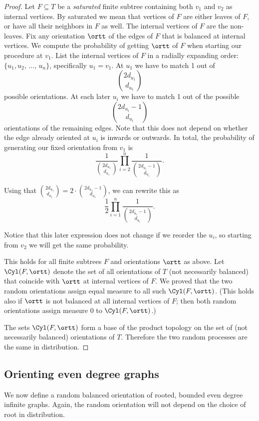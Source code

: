 \begin{proof}
Let $F \subseteq T$ be a \emph{saturated} finite subtree containing both $v_1$ and $v_2$ as internal vertices. By saturated we mean that vertices of $F$ are either leaves of $F$, or have all their neighbors in $F$ as well. The internal vertices of $F$ are the non-leaves. Fix any orientation $\ortt$ of the edges of $F$ that is balanced at internal vertices. We compute the probability of getting $\ortt$ of $F$ when starting our procedure at $v_1$. List the internal vertices of $F$ in a radially expanding order: $\{u_1, u_2,\,\ldots,\,u_n\}$, specifically $u_1 = v_1$. At $u_1$ we have to match 1 out of
\[
\binom{2d_{u_1}}{d_{u_1}}
\]
possible orientations. At each later $u_i$ we have to match 1 out of the possible
\[
\binom{2d_{u_i}-1}{d_{u_i}}
\]
orientations of the remaining edges. Note that this does not depend on whether the edge already oriented at $u_i$ is inwards or outwards. In total, the probability of generating our fixed orientation from $v_1$ is
\[
\frac{1}{\binom{2d_{u_1}}{d_{u_1}}}\prod_{i=2}^{n}\frac{1}{\binom{2d_{u_i}-1}{d_{u_i}}}.
\]

Using that $\binom{2d_{u_1}}{d_{u_1}} = 2 \cdot \binom{2d_{u_1}-1}{d_{u_1}}$, we can rewrite this as
\[
\frac{1}{2}\prod_{i=1}^{n}\frac{1}{\binom{2d_{u_i}-1}{d_{u_i}}}.
\]

Notice that this later expression does not change if we reorder the $u_i$, so starting from $v_2$ we will get the same probability.

This holds for all finite subtrees $F$ and orientations $\ortt$ as above. Let $\Cyl(F,\ortt)$ denote the set of all orientations of $T$ (not necessarily balanced) that coincide with $\ortt$ at internal vertices of $F$. We proved that the two random orientations assign equal measure to all such $\Cyl(F,\ortt)$. (This holds also if $\ortt$ is not balanced at all internal vertices of $F$; then both random orientations assign measure 0 to $\Cyl(F,\ortt)$.)

The sets $\Cyl(F,\ortt)$ form a base of the product topology on the set of (not necessarily balanced) orientations of $T$. Therefore the two random processes are the same in distribution.
\end{proof}


\subsection{Orienting even degree graphs}
We now define a random balanced orientation of rooted, bounded even degree infinite graphs. Again, the random orientation will not depend on the choice of root in distribution.

